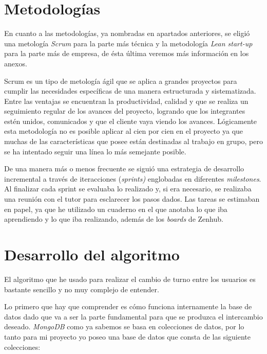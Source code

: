   \section{Metodologías}\label{metodologia}

En cuanto a las metodologías, ya nombradas en apartados anteriores, se eligió una metología \emph{Scrum} para la parte más técnica y la metodología \emph{Lean start-up} para la parte más de empresa, de ésta última veremos más información en los anexos.

Scrum es un tipo de metología ágil que se aplica a grandes proyectos para cumplir las necesidades específicas de una manera estructurada y sistematizada. Entre las ventajas se encuentran la productividad, calidad y que se realiza un seguimiento regular de los avances del proyecto, logrando que los integrantes estén unidos, comunicados y que el cliente vaya viendo los avances. Lógicamente esta metodología no es posible aplicar al cien por cien en el proyecto ya que muchas de las características que posee están destinadas al trabajo en grupo, pero se ha intentado seguir una línea lo más semejante posible. 




 De una manera más o menos frecuente se siguió una estrategia de desarrollo incremental a través de iteracciones (\emph{sprints)} englobadas en diferentes \emph{milestones}. Al finalizar cada sprint se evaluaba lo realizado y, si era necesario, se realizaba una reunión con el tutor para esclarecer los pasos dados. Las tareas se estimaban en papel, ya que he utilizado un cuaderno en el que anotaba lo que iba aprendiendo y lo que iba realizando, además de los  \emph{boards} de Zenhub. 
 
   \section{Desarrollo del algoritmo}\label{algoritmo}
   El algoritmo que he usado para realizar el cambio de turno entre los usuarios es bastante sencillo y no muy complejo de entender.
   
   Lo primero que hay que comprender es cómo funciona internamente la base de datos dado que va a ser la parte fundamental para que se produzca el intercambio deseado. \emph{MongoDB} como ya sabemos  se basa en colecciones de datos, por lo tanto para mi proyecto yo poseo una base de datos que consta de las siguiente colecciones:
   
